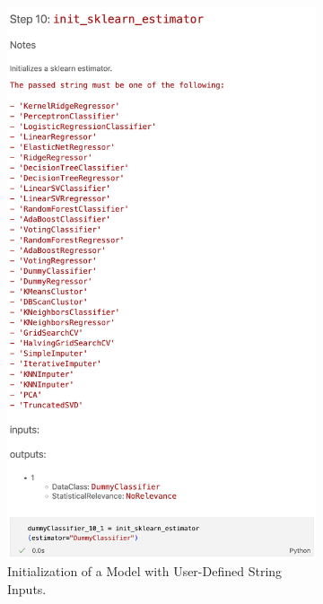 \begin{figure}[h]
    \centering
    \begin{subfigure}[t]{.47\textwidth}
        \centering
        \includegraphics[width=\textwidth]{Tex//images//native_ape_eval//init_classifier.png}
        \caption{Initialization of a Model with User-Defined String Inputs.}
        \label{fig:native_ape_init_classifier}
    \end{subfigure}%
    \hfill
    \begin{subfigure}[t]{.47\textwidth}

\end{subfigure}
\end{figure}
